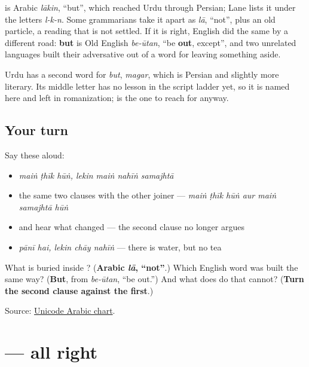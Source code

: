 \begin{cousinweb}
\textbf{} is Arabic \emph{lākin}, \textquotedblleft{}but\textquotedblright{}, which reached Urdu through Persian; Lane lists it under the letters \emph{l-k-n}. Some grammarians take it apart as \emph{lā}, \textquotedblleft{}not\textquotedblright{}, plus an old particle, a reading that is not settled. If it is right, English did the same by a different road: \textbf{but} is Old English \emph{be-ūtan}, \textquotedblleft{}be \textbf{out}, except\textquotedblright{}, and two unrelated languages built their adversative out of a word for leaving something aside.

Urdu has a second word for \emph{but}, \emph{magar}, which is Persian and slightly more literary. Its middle letter has no lesson in the script ladder yet, so it is named here and left in romanization; \textbf{} is the one to reach for anyway.
\end{cousinweb}

\subsection*{Your turn}
Say these aloud:

\begin{itemize}
\raggedright
  \item \emph{maiṅ ṭhīk hūṅ, lekin maiṅ nahīṅ samajhtā}
  \item the same two clauses with the other joiner — \emph{maiṅ ṭhīk hūṅ aur maiṅ samajhtā hūṅ}
  \item and hear what changed — the second clause no longer argues
  \item \emph{pānī hai, lekin chāy nahīṅ} — there is water, but no tea
\end{itemize}

\begin{tcolorbox}[breakable,colback=teal!4,colframe=teal!35!black,title={Before you move on}]
What is buried inside \textbf{}? (\textbf{Arabic \emph{lā}, \textquotedblleft{}not\textquotedblright{}}.) Which English word was built the same way? (\textbf{But}, from \emph{be-ūtan}, \textquotedblleft{}be out.\textquotedblright{}) And what does \textbf{} do that \textbf{} cannot? (\textbf{Turn the second clause against the first}.)

Source: \href{https://www.unicode.org/charts/PDF/U0600.pdf}{Unicode Arabic chart}.
\end{tcolorbox}
\section[\texorpdfstring{\ur{ٹھیک} \ur{ہے} (ṭhīk hai)}{ٹھیک ہے (ṭhīk hai)}]{  — all right}

